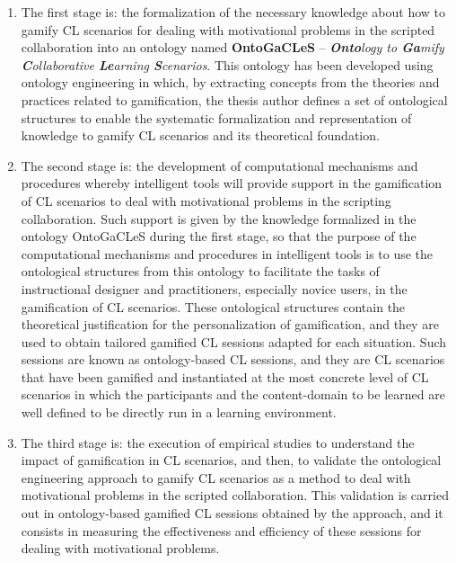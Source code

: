 \begin{enumerate}
\item
The first stage is: the formalization of the necessary knowledge about how to gamify CL scenarios for dealing with motivational problems in the scripted collaboration into an ontology named \textbf{OntoGaCLeS} – \emph{\textbf{Onto}logy to \textbf{Ga}mify \textbf{C}ollaborative \textbf{Le}arning \textbf{S}cenarios}. This ontology has been developed using ontology engineering in which, by extracting concepts from the theories and practices related to gamification, the thesis author defines a set of ontological structures to enable the systematic formalization and representation of knowledge to gamify CL scenarios and its theoretical foundation.

\item
The second stage is: the development of computational mechanisms and procedures whereby intelligent tools will provide support in the gamification of CL scenarios to deal with motivational problems in the scripting collaboration.
Such support is given by the knowledge formalized in the ontology OntoGaCLeS during the first stage, so that the purpose of the computational mechanisms and procedures in intelligent tools is to use the ontological structures from this ontology to facilitate the tasks of instructional designer and practitioners, especially novice users, in the gamification of CL scenarios. 
These ontological structures contain the theoretical justification for the personalization of gamification, and they are used to obtain tailored gamified CL sessions adapted for each situation.
Such sessions are known as ontology-based CL sessions, and they are CL scenarios that have been gamified and instantiated at the most concrete level of CL scenarios in which the participants and the content-domain to be learned are well defined to be directly run in a learning environment.

\item
The third stage is: the execution of empirical studies to understand the impact of gamification in CL scenarios, and then, to validate the ontological engineering approach to gamify CL scenarios as a method to deal with motivational problems in the scripted collaboration.
This validation is carried out in ontology-based gamified CL sessions obtained by the approach, and it consists in measuring the effectiveness and efficiency of these sessions for dealing with motivational problems.
\end{enumerate}

